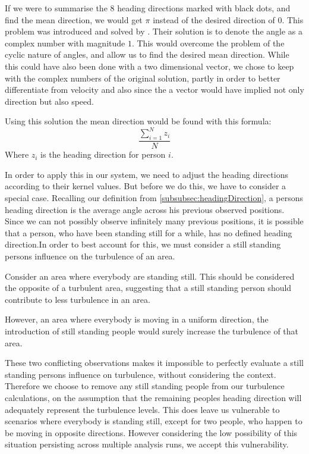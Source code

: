 If we were to summarise the 8 heading directions marked with black dots, and find the mean direction, we would get $\pi$ instead of the desired direction of $0$. This problem was introduced and solved by \citet{localTrendStatistics}. Their solution is to denote the angle as a complex number with magnitude $1$. This would overcome the problem of the cyclic nature of angles, and allow us to find the desired mean direction. While this could have also been done with a two dimensional vector, we chose to keep with the complex numbers of the original solution, partly in order to better differentiate from velocity and also since the a vector would have implied not only direction but also speed.

Using this solution the mean direction would be found with this formula: $$\frac{\sum_{i=1}^{N} z_i}{N}$$ Where $z_i$ is the heading direction for person $i$.

In order to apply this in our system, we need to adjust the heading directions according to their kernel values. But before we do this, we have to consider a special case. Recalling our definition from \cref{subsubsec:headingDirection}, a persons heading direction is the average angle across his previous observed positions. Since we can not possibly observe infinitely many previous positions, it is possible that a person, who have been standing still for a while, has no defined heading direction.In order to best account for this, we must consider a still standing persons influence on the turbulence of an area.

Consider an area where everybody are standing still. This should be considered the opposite of a turbulent area, suggesting that a still standing person should contribute to less turbulence in an area.

However, an area where everybody is moving in a uniform direction, the introduction of still standing people would surely increase the turbulence of that area.

These two conflicting observations makes it impossible to perfectly evaluate a still standing persons influence on turbulence, without considering the context. Therefore we choose to remove any still standing people from our turbulence calculations, on the assumption that the remaining peoples heading direction will adequately represent the turbulence levels. This does leave us vulnerable to scenarios where everybody is standing still, except for two people, who happen to be moving in opposite  directions. However considering the low possibility of this situation persisting across multiple analysis runs, we accept this vulnerability.

